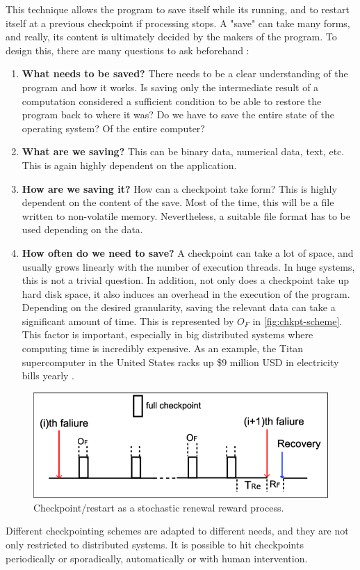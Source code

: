 {This technique allows the program to save itself while its running, and to restart itself at a previous checkpoint if processing stops. A "save" can take many forms, and really, its content is ultimately decided by the makers of the program. To design this, there are many questions to ask beforehand :
\begin{enumerate}
	\item \textbf{What needs to be saved?} There needs to be a clear understanding of the program and how it works. Is saving only the intermediate result of a computation considered a sufficient condition to be able to restore the program back to where it was? Do we have to save the entire state of the operating system? Of the entire computer? 
	\item \textbf{What are we saving?} This can be binary data, numerical data, text, etc. This is again highly dependent on the application.
	\item \textbf{How are we saving it?} How can a checkpoint take form? This is highly dependent on the content of the save. Most of the time, this will be a file written to non-volatile memory. Nevertheless, a suitable file format has to be used depending on the data.
	\item \textbf{How often do we need to save?} A checkpoint can take a lot of space, and usually grows linearly with the number of execution threads. In huge systems, this is not a trivial question. In addition, not only does a checkpoint take up hard disk space, it also induces an overhead in the execution of the program. Depending on the desired granularity, saving the relevant data can take a significant amount of time. This is represented by $O_F$ in \autoref{fig:chkpt-scheme}. This factor is important, especially in big distributed systems where computing time is incredibly expensive. As an example, the Titan supercomputer in the United States racks up \$9 million USD in electricity bills yearly \cite{online:henn}.
\end{enumerate}
\begin{figure}[H]
	\centering
	\includegraphics[width=0.9\linewidth, keepaspectratio]{art/checkpoint-scheme.png}
	\caption{Checkpoint/restart as a stochastic renewal reward process.}
	\label{fig:chkpt-scheme}
\end{figure}
Different checkpointing schemes are adapted to different needs, and they are not only restricted to distributed systems. It is possible to hit checkpoints periodically or sporadically, automatically or with human intervention.

}
